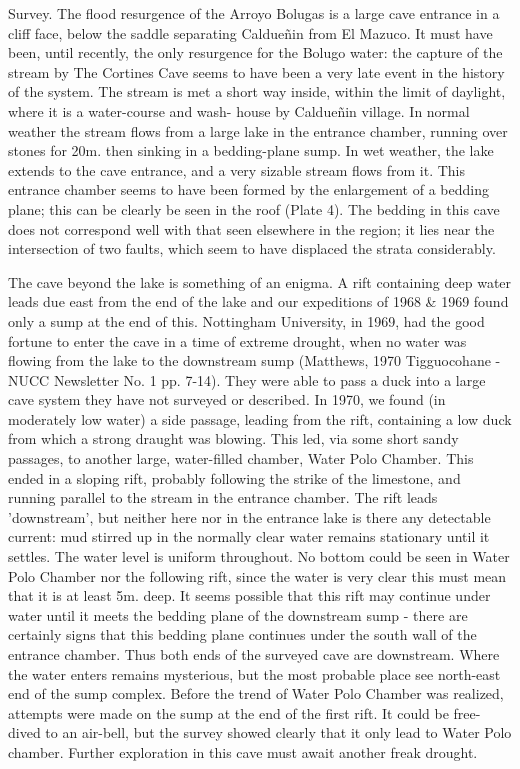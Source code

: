 \documentclass[11pt, a4paper, twoside]{memoir}
\begin{document}
Survey. The flood resurgence of the Arroyo Bolugas is a large cave entrance in a cliff face, below the saddle separating Caldueñin from El Mazuco. It must have been, until recently, the only resurgence for the Bolugo water: the capture of the stream by The Cortines Cave seems to have been a very late event in the history of the system. The stream is met a short way inside, within the limit of daylight, where it is a water-course and wash- house by Caldueñin village. In normal weather the stream flows from a large lake in the entrance chamber, running over stones for 20m. then sinking in a bedding-plane sump. In wet weather, the lake extends to the cave entrance, and a very sizable stream flows from it. This entrance chamber seems to have been formed by the enlargement of a bedding plane; this can be clearly be seen in the roof (Plate 4). The bedding in this cave does not correspond well with that seen elsewhere in the region; it lies near the intersection of two faults, which seem to have displaced the strata considerably.

The cave beyond the lake is something of an enigma. A rift containing deep water leads due east from the end of the lake and our expeditions of 1968 \& 1969 found only a sump at the end of this. Nottingham University, in 1969, had the good fortune to enter the cave in a time of extreme drought, when no water was flowing from the lake to the downstream sump (Matthews, 1970 Tigguocohane - NUCC Newsletter No. 1 pp. 7-14). They were able to pass a duck into a large cave system they have not surveyed or described. In 1970, we found (in moderately low water) a side passage, leading from the rift, containing a low duck from which a strong draught was blowing. This led, via some short sandy passages, to another large, water-filled chamber, Water Polo Chamber. This ended in a sloping rift, probably following the strike of the limestone, and running parallel to the stream in the entrance chamber. The rift leads 'downstream', but neither here nor in the entrance lake is there any detectable current: mud stirred up in the normally clear water remains stationary until it settles. The water level is uniform throughout. No bottom could be seen in Water Polo Chamber nor the following rift, since the water is very clear this must mean that it is at least 5m. deep. It seems possible that this rift may continue under water until it meets the bedding plane of the downstream sump - there are certainly signs that this bedding plane continues under the south wall of the entrance chamber. Thus both ends of the surveyed cave are downstream. Where the water enters remains mysterious, but the most probable place see north-east end of the sump complex. Before the trend of Water Polo Chamber was realized, attempts were made on the sump at the end of the first rift. It could be free-dived to an air-bell, but the survey showed clearly that it only lead to Water Polo chamber. Further exploration in this cave must await another freak drought.
\end{document}
